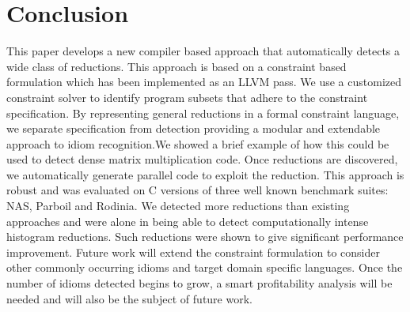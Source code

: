 
\section{Conclusion}

This paper develops a new compiler based approach that
automatically detects a wide class of reductions. 
This approach is based on a constraint based formulation which has
been implemented as an LLVM pass. We use a customized constraint
solver to identify program subsets that adhere to the constraint
specification.  By representing general reductions in a formal
constraint language, we separate specification from detection
providing a modular and extendable approach to idiom recognition.We
showed a brief example of how this could be used to detect dense
matrix multiplication code.  Once reductions are discovered, we
automatically generate parallel code to exploit the reduction. This
approach is robust and was evaluated on C versions of three well known
benchmark suites: NAS, Parboil and Rodinia. We detected 
more reductions than existing approaches and were alone in being able
to detect computationally intense  histogram reductions. Such
reductions were shown to give significant performance improvement.
Future work will extend the constraint formulation to consider other
commonly occurring idioms and target domain specific languages. Once the number of idioms detected begins to grow, a smart profitability analysis will be needed and will also be the subject of future work.




